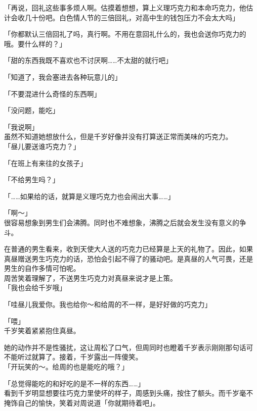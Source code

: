 「再说，回礼这些事多烦人啊。估摸着想想，算上义理巧克力和本命巧克力，他估计会收几十份吧。白色情人节的三倍回礼，对高中生的钱包压力不会太大吗」

「你都默认三倍回礼了吗，真行啊。不用在意回礼什么的，我也会送你巧克力的哦。要什么样的？」

「甜的东西我既不喜欢也不讨厌啊……不太甜的就行吧」

「知道了，我会塞进去各种玩意儿的」

「不要混进什么奇怪的东西啊」

「没问题，能吃」

「我说啊」\\

虽然不知道她想放什么，但是千岁好像并没有打算送正常而美味的巧克力。\\

「昼儿要送谁巧克力？」

「在班上有来往的女孩子」

「不给男生吗？」

「……如果给的话，就算是义理巧克力也会闹出大事……」

「啊～」\\

很容易想象到男生们会沸腾。同时也不难想象，沸腾之后就会发生没有意义的争斗。

在普通的男生看来，收到天使大人送的巧克力已经算是上天的礼物了。因此，如果真昼赠送男生巧克力的话，恐怕会引起不得了的骚动吧。是真昼的人气可畏，还是男生的自作多情可怕呢。\\

周苦笑着理解了，不送男生巧克力对真昼来说才是上策。\\

「我也会给千岁哦」

「哇昼儿我爱你。我也给你～和给周的不一样，是好好做的巧克力」

「喂」\\

千岁笑着紧紧抱住真昼。

她的动作并不是性骚扰，这让周松了口气，但周同时也瞪着千岁表示刚刚那句话可不能听过就算了。接着，千岁露出一阵傻笑。\\

「开玩笑的～。给周的也是能吃的哦？」

「总觉得能吃的和好吃的是不一样的东西……」\\

看到千岁明显想要往巧克力里使坏的样子，周感到头痛，按住了额头。而千岁毫不掩饰自己的愉快，笑着对周说道「你就期待着吧」。
